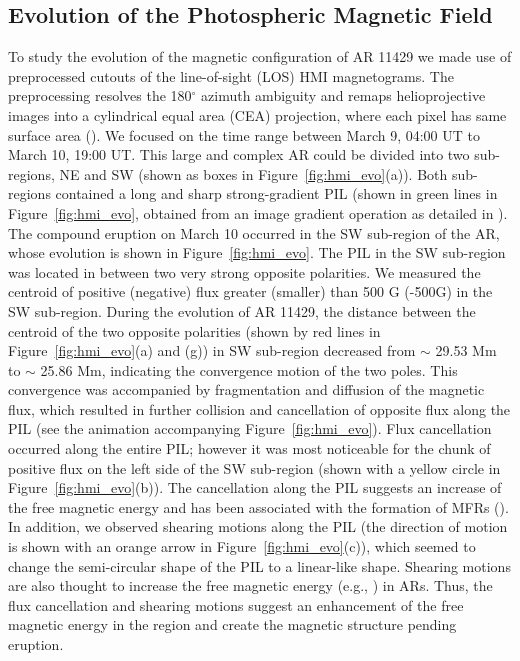 \documentclass{aastex62}
\begin{document}
\subsection{\textbf{Evolution of the Photospheric Magnetic Field}}
To study the evolution of the magnetic configuration of AR 11429 we made use of preprocessed cutouts of the line-of-sight (LOS) HMI magnetograms. The preprocessing resolves the 180$^{\circ}$ azimuth ambiguity and remaps helioprojective images into a cylindrical equal area (CEA) projection, where each pixel has same surface area (\citealt{Hoeksema_etal_2014}). We focused on the time range between March 9, 04:00 UT to March 10, 19:00 UT. This large and complex AR could be divided into two sub-regions, NE and SW (shown as boxes in Figure~\ref{fig:hmi_evo}(a)). Both sub-regions contained a long and sharp strong-gradient PIL (shown in green lines in Figure~\ref{fig:hmi_evo}, obtained from an image gradient operation as detailed in \citealt{Zhang_etal_2010}). The compound eruption on March 10 occurred in the SW sub-region of the AR, whose evolution is shown in Figure~\ref{fig:hmi_evo}. The PIL in the SW sub-region was located in between two very strong opposite polarities. We measured the centroid of positive (negative) flux greater (smaller) than 500 G (-500G) in the SW sub-region. During the evolution of AR 11429, the distance between the centroid of the two opposite polarities (shown by red lines in Figure~\ref{fig:hmi_evo}(a) and (g)) in SW sub-region decreased from $\sim$ 29.53 Mm to $\sim$ 25.86 Mm, indicating the convergence motion of the two poles. This convergence was accompanied by fragmentation and diffusion of the magnetic flux, which resulted in further collision and cancellation of opposite flux along the PIL (see the animation accompanying Figure~\ref{fig:hmi_evo}). Flux cancellation occurred along the entire PIL; however it was most noticeable for the chunk of positive flux on the left side of the SW sub-region (shown with a yellow circle in Figure~\ref{fig:hmi_evo}(b)). The cancellation along the PIL suggests an increase of the free magnetic energy and has been associated with the formation of MFRs (\citealt{van_Ballegooijen_etal_1989, Green_etal_2011}). In addition, we observed  shearing motions along the PIL (the direction of motion is shown with an orange arrow in Figure~\ref{fig:hmi_evo}(c)), which seemed to change the semi-circular shape of the PIL to a linear-like shape. Shearing motions are also thought to increase the free magnetic energy (e.g., \citealt{Cheng_etal_2014}) in ARs. Thus, the flux cancellation and shearing motions suggest an enhancement of the free magnetic energy in the region and create the magnetic structure pending eruption.
\end{document}
